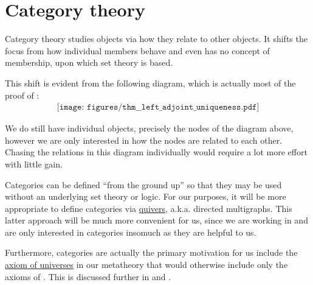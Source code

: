\section{Category theory}\label{sec:category_theory}

Category theory studies objects via how they relate to other objects. It shifts the focus from how individual members behave and even has no concept of membership, upon which set theory is based.

This shift is evident from the following diagram, which is actually most of the proof of :
\begin{equation*}
  \begin{aligned}
    \texttt{[image: figures/thm\_\_left\_adjoint\_uniqueness.pdf]}
  \end{aligned}
\end{equation*}

We do still have individual objects, precisely the nodes of the diagram above, however we are only interested in how the nodes are related to each other. Chasing the relations in this diagram individually would require a lot more effort with little gain.

Categories can be defined \enquote{from the ground up} so that they may be used without an underlying set theory or logic. For our purposes, it will be more appropriate to define categories via \hyperref[def:quiver]{quivers}, a.k.a. directed multigraphs. This latter approach will be much more convenient for us, since we are working in \hyperref[def:axiom_of_universes]{} and are only interested in categories insomuch as they are helpful to us.

Furthermore, categories are actually the primary motivation for us include the \hyperref[def:axiom_of_universes]{axiom of universes} in our metatheory that would otherwise include only the axioms of \hyperref[def:zfc]{}. This is discussed further in  and .
